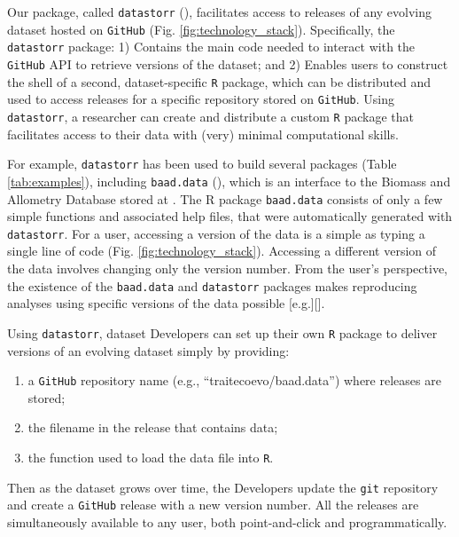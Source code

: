 \documentclass[a4paper,num-refs]{assets/oup-contemporary}
\begin{document}
Our package, called \texttt{datastorr} (), facilitates access to releases of any evolving dataset hosted on \texttt{GitHub} (Fig. \ref{fig:technology_stack}). Specifically, the \texttt{datastorr} package: 1) Contains the main code needed to interact with the \texttt{GitHub} API to retrieve versions of the dataset; and 2) Enables users to construct the shell of a second, dataset-specific \texttt{R} package, which can be distributed and used to access releases for a specific repository stored on \texttt{GitHub}. Using \texttt{datastorr}, a researcher can create and distribute a custom \texttt{R} package that facilitates access to their data with (very) minimal computational skills.

For example, \texttt{datastorr} has been used to build several packages (Table \ref{tab:examples}), including \texttt{baad.data} (), which is an interface to the Biomass and Allometry Database \cite{Falster-2015} stored at . The R package \texttt{baad.data} consists of only a few simple functions and associated help files, that were automatically generated with \texttt{datastorr}. For a user, accessing a version of the data is a simple as typing a single line of code (Fig. \ref{fig:technology_stack}). Accessing a different version of the data involves changing only the version number. From the user's perspective, the existence of the \texttt{baad.data} and \texttt{datastorr} packages makes reproducing analyses using specific versions of the data possible [e.g.][]\cite{Duursma-2016,Falster-2018}.


Using \texttt{datastorr}, dataset Developers can set up their own \texttt{R} package to deliver versions of an evolving dataset simply by providing:
\begin{enumerate}
  \item a \texttt{GitHub} repository name (e.g., ``traitecoevo/baad.data'') where releases are stored;
  \item the filename in the release that contains data;
  \item the function used to load the data file into \texttt{R}.
\end{enumerate}

Then as the dataset grows over time, the Developers update the \texttt{git} repository and create a \texttt{GitHub} release with a new version number. All the releases are simultaneously available to any user, both point-and-click and programmatically.
\end{document}
